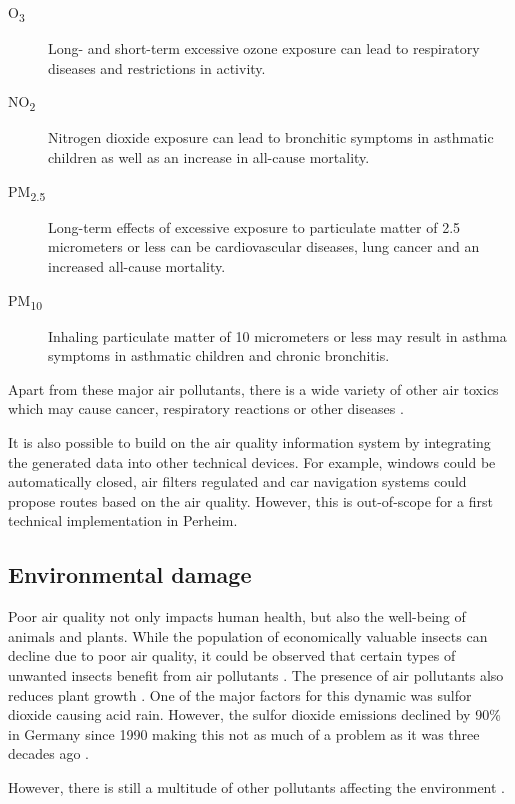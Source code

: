 \documentclass[conference]{IEEEtran}
\begin{document}
\begin{description} 
\item[O\textsubscript{3}] Long- and short-term excessive ozone exposure can lead to respiratory diseases and restrictions in activity.
\item[NO\textsubscript{2}] Nitrogen dioxide exposure can lead to bronchitic symptoms in asthmatic children as well as an increase in all-cause mortality.
\item[PM\textsubscript{2.5}] Long-term effects of excessive exposure to particulate matter of 2.5 micrometers or less can be cardiovascular diseases, lung cancer and an increased all-cause mortality.
\item[PM\textsubscript{10}] Inhaling particulate matter of 10 micrometers or less may result in asthma symptoms in asthmatic children and chronic bronchitis.
\end{description} 

Apart from these major air pollutants, there is a wide variety of other air toxics which may cause cancer, respiratory reactions or other diseases \cite{UnitedStatesEnvironmentalProtectionAgency}.

It is also possible to  build on the air quality information system by integrating the generated data into other technical devices. For example, windows could be automatically closed, air filters regulated and car navigation systems could propose routes based on the air quality. However, this is out-of-scope for a first technical implementation in Perheim.

\subsection{Environmental damage}
Poor air quality not only impacts human health, but also the well-being of animals and plants. While the population of economically valuable insects can decline due to poor air quality, it could be observed that certain types of unwanted insects benefit from air pollutants \cite{Dohmen.1984}\cite{Alstad.1982}. The presence of air pollutants also reduces plant growth \cite{CRITTENDEN.1978}. One of the major factors for this dynamic was sulfor dioxide causing acid rain. However, the sulfor dioxide emissions declined by 90\% in Germany since 1990 making this not as much of a problem as it was three decades ago \cite{Umweltbundesamt.01.05.2019}.

However, there is still a multitude of other pollutants affecting the environment \cite{Umweltbundesamt.2018}\cite{UnitedStatesEnvironmentalProtectionAgency.01.05.2019}.
\end{document}
